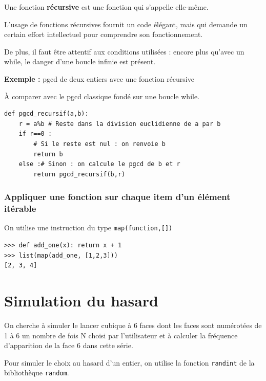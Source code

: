 Une fonction \textbf{récursive} est une fonction qui s'appelle elle-même.

L'usage de fonctions récursives fournit un code élégant, mais qui demande un certain effort intellectuel
pour comprendre son fonctionnement. 

De plus, il faut être attentif aux conditions utilisées : encore plus
qu'avec un while, le danger d'une boucle infinie est présent.

\medskip

\textbf{\large Exemple :} pgcd de deux entiers avec une fonction récursive

À comparer avec le pgcd classique fondé sur une boucle while.

\begin{lstlisting}
def pgcd_recursif(a,b):
	r = a%b # Reste dans la division euclidienne de a par b
	if r==0 :
		# Si le reste est nul : on renvoie b
		return b
	else :# Sinon : on calcule le pgcd de b et r
		return pgcd_recursif(b,r)
\end{lstlisting}

\subsubsection{Appliquer une fonction sur chaque item d'un élément itérable}

On utilise une instruction du type \verb!map(function,[])!

\begin{lstlisting}
>>> def add_one(x): return x + 1
>>> list(map(add_one, [1,2,3]))
[2, 3, 4]
\end{lstlisting}


\section{Simulation du hasard}

On cherche à simuler le lancer cubique à 6 faces dont les faces sont numérotées de 1 à 6 un nombre de fois N choisi par l'utilisateur et à calculer la fréquence d'apparition de la face 6 dans cette série.

Pour simuler le choix au hasard d'un entier, on utilise la fonction \verb!randint! de la bibliothèque \verb!random!.

